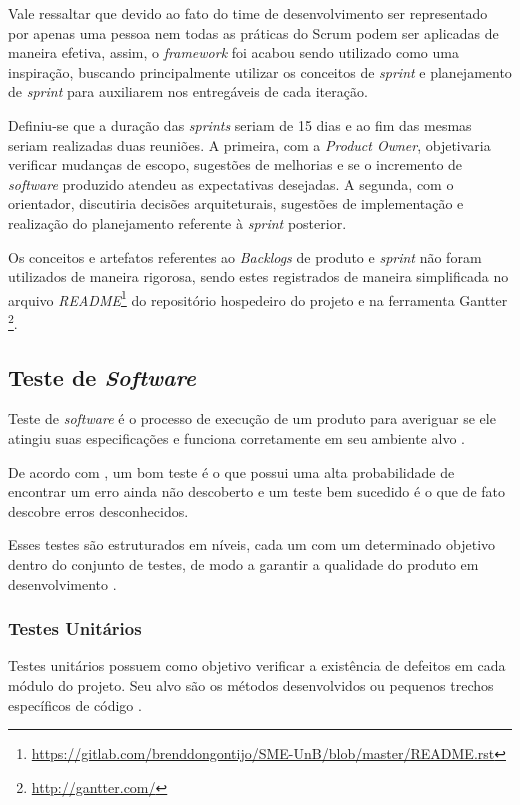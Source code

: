     Vale ressaltar que devido ao fato do time de desenvolvimento ser representado por apenas uma pessoa nem todas as práticas do Scrum podem ser aplicadas de maneira efetiva, assim, o \textit{framework} foi acabou sendo utilizado como uma inspiração, buscando principalmente utilizar
    os conceitos de \textit{sprint} e planejamento de \textit{sprint} para auxiliarem nos entregáveis de cada iteração.

    Definiu-se que a duração das \textit{sprints} seriam de 15 dias e ao fim das mesmas seriam realizadas duas reuniões. A primeira, com a \textit{Product Owner}, objetivaria verificar mudanças de escopo, sugestões de melhorias e se o incremento de \textit{software} produzido atendeu as expectativas desejadas. A segunda,
    com o orientador, discutiria decisões arquiteturais, sugestões de implementação e realização
    do planejamento referente à \textit{sprint} posterior.

    Os conceitos e artefatos referentes ao \textit{Backlogs} de produto e \textit{sprint} não foram utilizados de maneira rigorosa, sendo estes registrados de maneira simplificada no arquivo \textit{README}\footnote{\url{https://gitlab.com/brenddongontijo/SME-UnB/blob/master/README.rst}} do repositório hospedeiro do projeto e na ferramenta Gantter \footnote{\url{http://gantter.com/}}.

    \subsection{Teste de \textit{Software}}
    Teste de \textit{software} é o processo de execução de um produto para averiguar se ele atingiu suas especificações e funciona corretamente em seu ambiente alvo \cite{artigo_intro_teste}.

    De acordo com , um bom teste é o que possui uma alta probabilidade de encontrar um erro ainda não descoberto e um teste bem sucedido é o que de fato descobre erros desconhecidos.

    Esses testes são estruturados em níveis, cada um com um determinado objetivo dentro do conjunto de testes, de modo a garantir a qualidade do produto em desenvolvimento \cite{sw_test_tech}.

        \subsubsection{Testes Unitários}
        Testes unitários possuem como objetivo verificar a existência de defeitos em cada módulo do projeto. Seu alvo são os métodos desenvolvidos ou pequenos trechos específicos de código \cite{artigo_intro_teste}.

